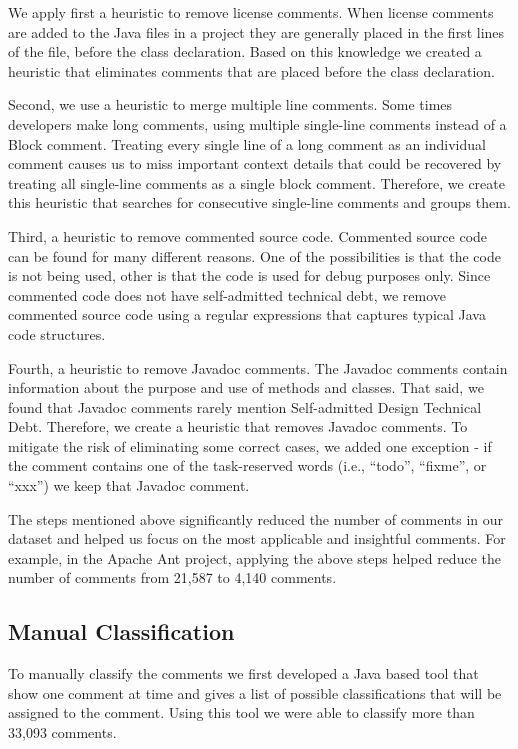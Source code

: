 We apply first a heuristic to remove license comments. When license comments are added to the Java files in a project they are generally placed in the first lines of the file, before the class declaration. Based on this knowledge we created a heuristic that eliminates comments that are placed before the class declaration. 

Second, we use a heuristic to merge multiple line comments. Some times developers make long comments, using multiple single-line comments instead of a Block comment. Treating every single line of a long comment as an individual comment causes us to miss important context details that could be recovered by treating all single-line comments as a single block comment. Therefore, we create this heuristic that searches for consecutive single-line comments and groups them.

Third, a heuristic to remove commented source code. Commented source code can be found for many different reasons. One of the possibilities is that the code is not being used, other is that the code is used for debug purposes only. Since commented code does not have self-admitted technical debt, we remove commented source code using a regular expressions that captures typical Java code structures.

Fourth, a heuristic to remove Javadoc comments. The Javadoc comments contain information about the purpose and use of methods and classes. That said, we found that Javadoc comments rarely mention Self-admitted Design Technical Debt. Therefore, we create a heuristic that removes Javadoc comments. To mitigate the risk of eliminating some correct cases, we added one exception - if the comment contains one of the task-reserved words (i.e., ``todo'', ``fixme'', or ``xxx'') we keep that Javadoc comment. 

The steps mentioned above significantly reduced the number of comments in our dataset and helped us focus on the most applicable and insightful comments. For example, in the Apache Ant project, applying the above steps helped reduce the number of comments from 21,587 to 4,140 comments.


\subsection{Manual Classification} %
\label{sub:manual_classification}

To manually classify the comments we first developed a Java based tool that show one comment at time and gives a list of possible classifications \cite{Alves2014MTD} that will be assigned to the comment. Using this tool we were able to classify more than 33,093 comments. 

